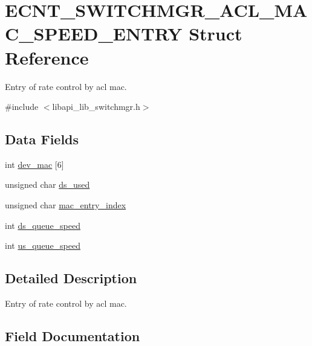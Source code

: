 \hypertarget{structECNT__SWITCHMGR__ACL__MAC__SPEED__ENTRY}{}\section{E\+C\+N\+T\+\_\+\+S\+W\+I\+T\+C\+H\+M\+G\+R\+\_\+\+A\+C\+L\+\_\+\+M\+A\+C\+\_\+\+S\+P\+E\+E\+D\+\_\+\+E\+N\+T\+RY Struct Reference}
\label{structECNT__SWITCHMGR__ACL__MAC__SPEED__ENTRY}


Entry of rate control by acl mac.  




{\ttfamily \#include $<$libapi\+\_\+lib\+\_\+switchmgr.\+h$>$}

\subsection*{Data Fields}
\begin{DoxyCompactItemize}
\item 
int \hyperlink{structECNT__SWITCHMGR__ACL__MAC__SPEED__ENTRY_a57166221963b117e5cb311c890eb8640}{dev\+\_\+mac} \mbox{[}6\mbox{]}
\item 
unsigned char \hyperlink{structECNT__SWITCHMGR__ACL__MAC__SPEED__ENTRY_a3a9675b6b079e2d152af0610340c47a7}{ds\+\_\+used}
\item 
unsigned char \hyperlink{structECNT__SWITCHMGR__ACL__MAC__SPEED__ENTRY_affea5b08caabd2120b275da6177271ef}{mac\+\_\+entry\+\_\+index}
\item 
int \hyperlink{structECNT__SWITCHMGR__ACL__MAC__SPEED__ENTRY_a1a9d591972b93d4f4f7f16bab78cc603}{ds\+\_\+queue\+\_\+speed}
\item 
int \hyperlink{structECNT__SWITCHMGR__ACL__MAC__SPEED__ENTRY_a851a22185cd2414c1378b5caff2c9952}{us\+\_\+queue\+\_\+speed}
\end{DoxyCompactItemize}


\subsection{Detailed Description}
Entry of rate control by acl mac. 

\subsection{Field Documentation}
\mbox{\label{structECNT__SWITCHMGR__ACL__MAC__SPEED__ENTRY_a57166221963b117e5cb311c890eb8640}} 
